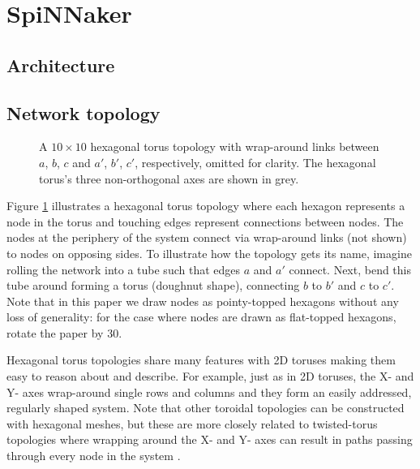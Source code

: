 	\section{SpiNNaker}
		\subsection{Architecture}
		\subsection{Network topology}
		
			
			
			\begin{figure}
				\center
				
				\caption{A $10 \times 10$ hexagonal torus topology with wrap-around
				links between $a$, $b$, $c$ and $a'$, $b'$, $c'$, respectively, omitted
				for clarity. The hexagonal torus's three non-orthogonal axes are shown
				in grey.}
				\label{fig:hexagonalTorusTopology}
			\end{figure}
			
			Figure \ref{fig:hexagonalTorusTopology} illustrates a hexagonal torus
			topology where each hexagon represents a node in the torus and touching
			edges represent connections between nodes. The nodes at the periphery of
			the system connect via wrap-around links (not shown) to nodes on opposing
			sides. To illustrate how the topology gets its name, imagine rolling the
			network into a tube such that edges $a$ and $a'$ connect. Next, bend this
			tube around forming a torus (doughnut shape), connecting $b$ to $b'$ and
			$c$ to $c'$. Note that in this paper we draw nodes as pointy-topped
			hexagons without any loss of generality: for the case where nodes are
			drawn as flat-topped hexagons, rotate the paper by 30\degree{}.
			
			Hexagonal torus topologies share many features with 2D toruses making them
			easy to reason about and describe. For example, just as in 2D toruses, the
			X- and Y- axes wrap-around single rows and columns and they form an easily
			addressed, regularly shaped system. Note that other toroidal topologies
			can be constructed with hexagonal meshes, but these are more closely
			related to twisted-torus topologies where wrapping around the X- and Y-
			axes can result in paths passing through every node in the system
			\cite{camara10}.
			
